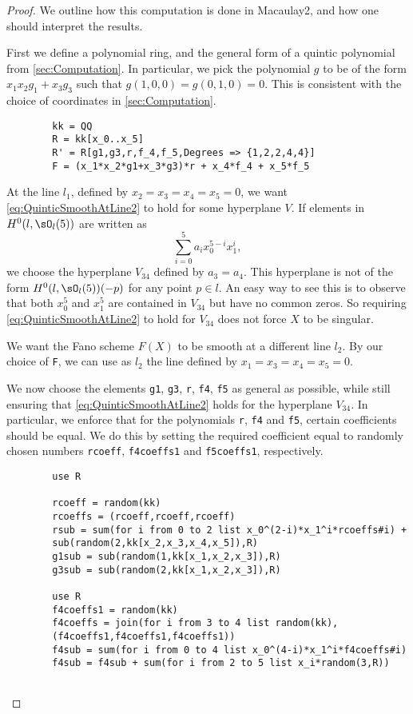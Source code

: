 \begin{proof}
	We outline how this computation is done in Macaulay2, and how one should interpret the results.
	
	First we define a polynomial ring, and the general form of a quintic polynomial from \cref{sec:Computation}. In particular, we pick the polynomial $g$ to be of the form $x_1x_2 g_1 + x_3g_3$ such that $g(1,0,0) = g(0,1,0) = 0$. This is consistent with the choice of coordinates in \cref{sec:Computation}.
	\begin{verbatim}
		kk = QQ
		R = kk[x_0..x_5]
		R' = R[g1,g3,r,f_4,f_5,Degrees => {1,2,2,4,4}]
		F = (x_1*x_2*g1+x_3*g3)*r + x_4*f_4 + x_5*f_5
	\end{verbatim}
	At the line $l_1$, defined by $x_2 = x_3 = x_4 = x_5=0$, we want \eqref{eq:QuinticSmoothAtLine2} to hold for some hyperplane $V$. If elements in $H^0(l,\sO_l(5))$ are written as
	\[\sum_{i=0}^5 a_ix_0^{5-i}x_1^i, \]
	we choose the hyperplane $V_{34}$ defined by $a_3 = a_4$. This hyperplane is not of the form $H^0(l,\sO_l(5))(-p)$ for any point $p \in l$. An easy way to see this is to observe that both $x_0^5$ and $x_1^5$ are contained in $V_{34}$ but have no common zeros.  So requiring \eqref{eq:QuinticSmoothAtLine2} to hold for $V_{34}$ does not force $X$ to be singular. 
	
	We want the Fano scheme $F(X)$ to be smooth at a different line $l_2$. By our choice of \lstinline{F}, we can use as $l_2$ the line defined by $x_1 = x_3 = x_4 = x_5=0$.
	
	We now choose the elements \lstinline{g1}, \lstinline{g3}, \lstinline{r}, \lstinline{f4}, \lstinline{f5} as general as possible, while still ensuring that \eqref{eq:QuinticSmoothAtLine2} holds for the hyperplane $V_{34}$. In particular, we enforce that for the polynomials \lstinline{r}, \lstinline{f4} and \lstinline{f5}, certain coefficients should be equal. We do this by setting the required coefficient equal to randomly chosen numbers \lstinline{rcoeff}, \lstinline{f4coeffs1} and \lstinline{f5coeffs1}, respectively.
	\begin{verbatim}
		use R
		
		rcoeff = random(kk)
		rcoeffs = (rcoeff,rcoeff,rcoeff)
		rsub = sum(for i from 0 to 2 list x_0^(2-i)*x_1^i*rcoeffs#i) +
		sub(random(2,kk[x_2,x_3,x_4,x_5]),R)
		g1sub = sub(random(1,kk[x_1,x_2,x_3]),R)
		g3sub = sub(random(2,kk[x_1,x_2,x_3]),R)
		
		use R
		f4coeffs1 = random(kk)
		f4coeffs = join(for i from 3 to 4 list random(kk),
		(f4coeffs1,f4coeffs1,f4coeffs1))
		f4sub = sum(for i from 0 to 4 list x_0^(4-i)*x_1^i*f4coeffs#i)
		f4sub = f4sub + sum(for i from 2 to 5 list x_i*random(3,R))
		

\end{verbatim}
\end{proof}
